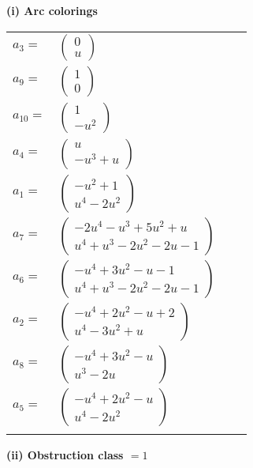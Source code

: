 \documentclass[1p]{elsarticle_modified}
\theoremstyle{definition}
\begin{document}
\flushleft \textbf{(i) Arc colorings}\\
\begin{tabular}{m{7pt} m{180pt} m{7pt} m{180pt} }
\flushright $a_{3}=$&$\begin{pmatrix}0\\u\end{pmatrix}$ \\
\flushright $a_{9}=$&$\begin{pmatrix}1\\0\end{pmatrix}$ \\
\flushright $a_{10}=$&$\begin{pmatrix}1\\- u^2\end{pmatrix}$ \\
\flushright $a_{4}=$&$\begin{pmatrix}u\\- u^3+u\end{pmatrix}$ \\
\flushright $a_{1}=$&$\begin{pmatrix}- u^2+1\\u^4-2 u^2\end{pmatrix}$ \\
\flushright $a_{7}=$&$\begin{pmatrix}-2 u^4- u^3+5 u^2+u\\u^4+u^3-2 u^2-2 u-1\end{pmatrix}$ \\
\flushright $a_{6}=$&$\begin{pmatrix}- u^4+3 u^2- u-1\\u^4+u^3-2 u^2-2 u-1\end{pmatrix}$ \\
\flushright $a_{2}=$&$\begin{pmatrix}- u^4+2 u^2- u+2\\u^4-3 u^2+u\end{pmatrix}$ \\
\flushright $a_{8}=$&$\begin{pmatrix}- u^4+3 u^2- u\\u^3-2 u\end{pmatrix}$ \\
\flushright $a_{5}=$&$\begin{pmatrix}- u^4+2 u^2- u\\u^4-2 u^2\end{pmatrix}$\\&\end{tabular}
\flushleft \textbf{(ii) Obstruction class $= 1$}\\~\\
\end{document}
